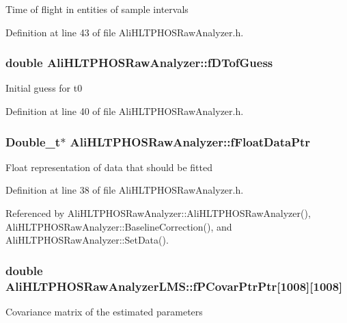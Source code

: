 Time of flight in entities of sample intervals 

Definition at line 43 of file Ali\-HLTPHOSRaw\-Analyzer.h.
\subsubsection{\setlength{\rightskip}{0pt plus 5cm}double {\bf Ali\-HLTPHOSRaw\-Analyzer::f\-DTof\-Guess}\hspace{0.3cm}{\tt  [protected, inherited]}}\label{classAliHLTPHOSRawAnalyzer_AliHLTPHOSRawAnalyzerPeakFinderp2}


Initial guess for t0 

Definition at line 40 of file Ali\-HLTPHOSRaw\-Analyzer.h.
\subsubsection{\setlength{\rightskip}{0pt plus 5cm}Double\_\-t$\ast$ {\bf Ali\-HLTPHOSRaw\-Analyzer::f\-Float\-Data\-Ptr}\hspace{0.3cm}{\tt  [protected, inherited]}}\label{classAliHLTPHOSRawAnalyzer_AliHLTPHOSRawAnalyzerPeakFinderp0}


Float representation of data that should be fitted 

Definition at line 38 of file Ali\-HLTPHOSRaw\-Analyzer.h.

Referenced by Ali\-HLTPHOSRaw\-Analyzer::Ali\-HLTPHOSRaw\-Analyzer(), Ali\-HLTPHOSRaw\-Analyzer::Baseline\-Correction(), and Ali\-HLTPHOSRaw\-Analyzer::Set\-Data().
\subsubsection{\setlength{\rightskip}{0pt plus 5cm}double {\bf Ali\-HLTPHOSRaw\-Analyzer\-LMS::f\-PCovar\-Ptr\-Ptr}[1008][1008]\hspace{0.3cm}{\tt  [private]}}\label{classAliHLTPHOSRawAnalyzerLMS_AliHLTPHOSRawAnalyzerLMSr1}


Covariance matrix of the estimated parameters 

